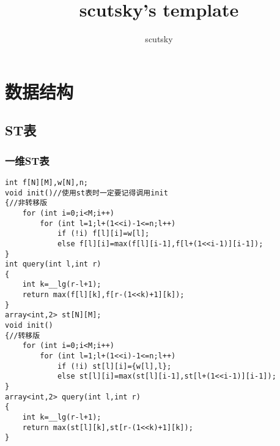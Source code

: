 \documentclass[a4paper]{ctexart}
\title{scutsky's template}
\author{scutsky}
\date{}
\begin{document}
\small
\begin{titlepage}
\maketitle
\end{titlepage}

\newpage
\pagestyle{empty}
\renewcommand{\contentsname}{目录}
\tableofcontents %
\newpage\clearpage
\newpage
\pagestyle{fancy}
\setcounter{page}{1}   %

\section{数据结构}

\subsection{ST表}
\subsubsection{一维ST表}
\begin{lstlisting}
int f[N][M],w[N],n;
void init()//使用st表时一定要记得调用init
{//非转移版
	for (int i=0;i<M;i++)
		for (int l=1;l+(1<<i)-1<=n;l++)
			if (!i) f[l][i]=w[l];
			else f[l][i]=max(f[l][i-1],f[l+(1<<i-1)][i-1]);
}
int query(int l,int r)
{
    int k=__lg(r-l+1);
    return max(f[l][k],f[r-(1<<k)+1][k]);
}
array<int,2> st[N][M];
void init()
{//转移版
    for (int i=0;i<M;i++)
        for (int l=1;l+(1<<i)-1<=n;l++)
            if (!i) st[l][i]={w[l],l};
            else st[l][i]=max(st[l][i-1],st[l+(1<<i-1)][i-1]);
}
array<int,2> query(int l,int r)
{
    int k=__lg(r-l+1);
    return max(st[l][k],st[r-(1<<k)+1][k]);
}
\end{lstlisting}
\end{document}
